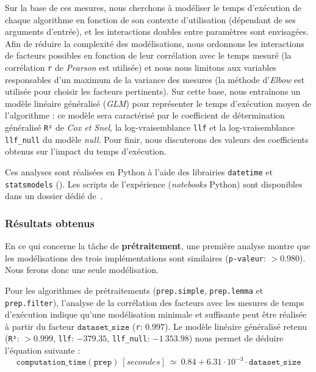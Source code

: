 			Sur la base de ces mesures, nous cherchons à modéliser le temps d'exécution de chaque algorithme en fonction de son contexte d'utilisation (dépendant de ses arguments d'entrée), et les interactions doubles entre paramètres sont envisagées.
			Afin de réduire la complexité des modélisations, nous ordonnons les interactions de facteurs possibles en fonction de leur corrélation avec le temps mesuré (la corrélation \texttt{r} de \textit{Pearson} est utilisée) et nous nous limitons aux variables responsables d'un maximum de la variance des mesures (la méthode d'\textit{Elbow} est utilisée pour choisir les facteurs pertinents).
			Sur cette base, nous entraînons un modèle linéaire généralisé (\textit{GLM}) pour représenter le temps d'exécution moyen de l'algorithme : ce modèle sera caractérisé par le coefficient de détermination généralisé \texttt{R²} de \textit{Cox et Snel}, la log-vraisemblance \texttt{llf} et la log-vraisemblance \texttt{llf\_null} du modèle \textit{null}.
			Pour finir, nous discuterons des valeurs des coefficients obtenus sur l'impact du temps d'exécution.
			
			\begin{leftBarInformation}
				Ces analyses sont réalisées en Python à l'aide des librairies \texttt{datetime} et \texttt{statsmodels} (\cite{seabold:2010}).
				Les scripts de l'expérience (\textit{notebooks} Python) sont disponibles dans un dossier dédié de~\cite{schild:cognitivefactory-interactive-clustering-comparative-study:2021}.
			\end{leftBarInformation}

		\subsubsection{Résultats obtenus}
				
			
			En ce qui concerne la tâche de \textbf{prétraitement}, une première analyse montre que les modélisations des trois implémentations sont similaires (\texttt{p-valeur}: $> 0.980$). Nous ferons donc une seule modélisation.
			
			Pour les algorithmes de prétraitements (\texttt{prep.simple}, \texttt{prep.lemma} et \texttt{prep.filter}), l'analyse de la corrélation des facteurs avec les mesures de temps d'exécution indique qu'une modélisation minimale et suffisante peut être réalisée à partir du facteur $\texttt{dataset\_size}$ (\texttt{r}: $0.997$).
			Le modèle linéaire généralisé retenu (\texttt{R²}: $> 0.999$, \texttt{llf}: $-379.35$, \texttt{llf\_null}: $-1~353.98$) nous permet de déduire l'équation suivante :
			\begin{equation}
				\texttt{computation\_time}(\texttt{prep})~[secondes]~
				\simeq~0.84 + 6.31 \cdot 10^{-3} \cdot \texttt{dataset\_size}
			\end{equation}
			
